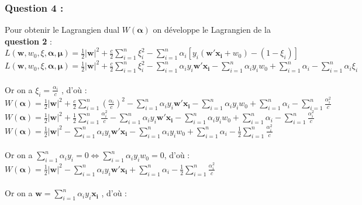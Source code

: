 \documentclass[a4paper, 10pt]{article}
\begin{document}
\subsubsection*{Question 4 :}

Pour obtenir le Lagrangien dual $W(\boldsymbol{\alpha})$ on développe le Lagrangien de la \textbf{question 2} :\\

$L(\mathbf{w},w_{0},\xi,\boldsymbol{\alpha},\boldsymbol{\mu}) = \frac{1}{2}| \mathbf{w} |^{2}+\frac{c}{2}\sum^{n}_{i=1} \xi^{2}_{i}-\sum^{n}_{i=1}\alpha_{i}[y_{i}(\mathbf{w'x_{i}}+w_{0})-(1-\xi_{i})]$\\

$L(\mathbf{w},w_{0},\xi,\boldsymbol{\alpha},\boldsymbol{\mu}) = \frac{1}{2}| \mathbf{w} |^{2}+\frac{c}{2}\sum^{n}_{i=1} \xi^{2}_{i} - \sum^{n}_{i=1}\alpha_{i}y_{i}\mathbf{w'x_{i}}  -\sum^{n}_{i=1}\alpha_{i}y_{i}w_{0} +\sum^{n}_{i=1}\alpha_{i} -\sum^{n}_{i=1}\alpha_{i}\xi_{i}$\\ \\
Or on a $ \xi_{i} = \frac{\alpha_{i}}{c}$ , d'où :\\

$W(\boldsymbol{\alpha}) = 
\frac{1}{2}| \mathbf{w} |^{2}
+\frac{c}{2}\sum^{n}_{i=1} (\frac{\alpha_{i}}{c})^{2}
- \sum^{n}_{i=1}\alpha_{i}y_{i}\mathbf{w'x_{i}}  
-\sum^{n}_{i=1}\alpha_{i}y_{i}w_{0} 
+\sum^{n}_{i=1}\alpha_{i} 
-\sum^{n}_{i=1}\frac{\alpha_{i}^{2}}{c}$\\

$W(\boldsymbol{\alpha}) = 
\frac{1}{2}| \mathbf{w} |^{2}
+\frac{1}{2}\sum^{n}_{i=1} \frac{\alpha_{i}^{2}}{c}
- \sum^{n}_{i=1}\alpha_{i}y_{i}\mathbf{w'x_{i}}  
-\sum^{n}_{i=1}\alpha_{i}y_{i}w_{0} 
+\sum^{n}_{i=1}\alpha_{i} 
-\sum^{n}_{i=1}\frac{\alpha_{i}^{2}}{c}$\\

$W(\boldsymbol{\alpha}) = 
\frac{1}{2}| \mathbf{w} |^{2}
- \sum^{n}_{i=1}\alpha_{i}y_{i}\mathbf{w'x_{i}}  
-\sum^{n}_{i=1}\alpha_{i}y_{i}w_{0} 
+\sum^{n}_{i=1}\alpha_{i} 
-\frac{1}{2}\sum^{n}_{i=1}\frac{\alpha_{i}^{2}}{c}$\\ \\
Or on a $\sum^{n}_{i=1}\alpha_{i}y_{i} = 0 \Longleftrightarrow \sum^{n}_{i=1}\alpha_{i}y_{i}w_{0} = 0$, d'où :\\

$W(\boldsymbol{\alpha}) = \frac{1}{2}| \mathbf{w} |^{2} - \sum^{n}_{i=1}\alpha_{i}y_{i}\mathbf{w'x_{i}} +\sum^{n}_{i=1}\alpha_{i} -\frac{1}{2}\sum^{n}_{i=1}\frac{\alpha_{i}^{2}}{c}$\\ \\
Or on a $\mathbf{w} = \sum^{n}_{i=1}\alpha_{i}y_{i}\mathbf{x_{i}} $ , d'où :\\
\end{document}
